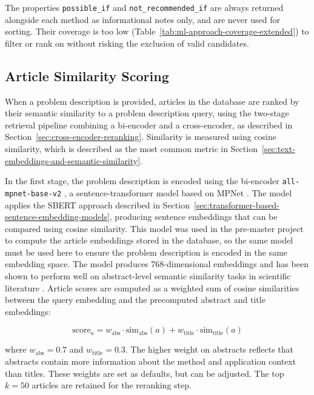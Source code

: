 The properties \texttt{possible\_if} and 
\texttt{not\_recommended\_if} are always returned alongside each 
method as informational notes only, and are never used for 
sorting. Their coverage is too low 
(Table~\ref{tab:ml-approach-coverage-extended}) to filter or rank 
on without risking the exclusion of valid candidates.

\subsection{Article Similarity Scoring}
\label{sec:article-similarity-scoring}

When a problem description is provided, articles in the database 
are ranked by their semantic similarity to a problem description query, using the 
two-stage retrieval pipeline combining a bi-encoder and a cross-encoder, as described in 
Section~\ref{sec:cross-encoder-reranking}. Similarity is 
measured using cosine similarity, which is described as the most common metric in
Section~\ref{sec:text-embeddings-and-semantic-similarity}.

In the first stage, the problem description is encoded using 
the bi-encoder
\texttt{all-mpnet-base-v2} \parencite{sbert_mpnet}, a 
sentence-transformer model based on MPNet \parencite{song2020mpnet}. 
The model applies the SBERT approach described in 
Section~\ref{sec:transformer-based-sentence-embedding-models}, 
producing sentence embeddings that can be compared using cosine similarity. This model was used in the pre-master 
project \parencite{bergsto2026mlselection} to compute the article 
embeddings stored in the database, so the same model must be used 
here to ensure the problem description is encoded in the 
same embedding space. The model produces 768-dimensional embeddings and has been shown to 
perform well on abstract-level semantic similarity tasks in 
scientific literature 
\parencite{galli2024performance_pre_trained_sentence_transformer_models, 
colangelo2025comparative_analysis_sentence_transformer_models}. 
Article scores are computed as a weighted sum of cosine 
similarities between the query embedding and the precomputed 
abstract and title embeddings:

\begin{equation}
    \text{score}_a = w_{\text{abs}} \cdot \text{sim}_{\text{abs}}(a)
                   + w_{\text{title}} \cdot \text{sim}_{\text{title}}(a)
    \label{eq:article-score}
\end{equation}

where $w_{\text{abs}} = 0.7$ and $w_{\text{title}} = 0.3$. The 
higher weight on abstracts reflects that abstracts contain more 
information about the method and application context than titles. 
These weights are set as defaults,
but can be adjusted. The top $k = 50$ articles are retained
for the reranking step.


